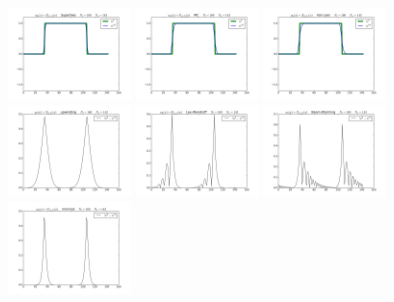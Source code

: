 \documentclass{article} %
\theoremstyle{plain}
\numberwithin{equation}{section} %
\numberwithin{figure}{section} %
\numberwithin{table}{section} %
\begin{document}
\begin{enumerate}[\ \ (a)]
\begin{figure}[ht!]
            \includegraphics[width=0.29\textwidth]{figures/power_4/problem_2_3_5_a.png}
            \includegraphics[width=0.29\textwidth]{figures/power_4/problem_2_3_6_a.png}
            \includegraphics[width=0.29\textwidth]{figures/power_4/problem_2_3_7_a.png}\\
            \includegraphics[width=0.29\textwidth]{figures/power_4/problem_2_3_1_b.png}
            \includegraphics[width=0.29\textwidth]{figures/power_4/problem_2_3_2_b.png}
            \includegraphics[width=0.29\textwidth]{figures/power_4/problem_2_3_3_b.png}
            \includegraphics[width=0.29\textwidth]{figures/power_4/problem_2_3_4_b.png}

\end{figure}
\end{enumerate}
\end{document}
